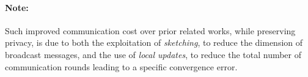 \documentclass[twoside]{article}
\begin{document}
\paragraph{Note:}
Such improved communication cost over prior related works, while preserving privacy, is due to both the exploitation of \emph{sketching}, to reduce the dimension of broadcast messages, and the use of \emph{local updates}, to reduce the total number of communication rounds leading to a specific convergence error.
%
\end{document}

